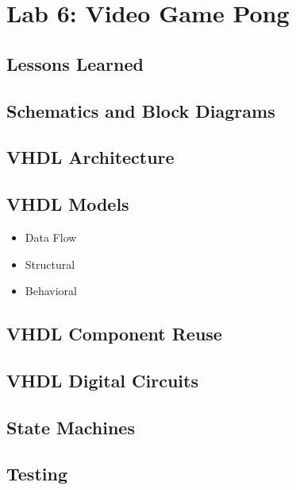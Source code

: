 \chapter{Lab 6: Video Game Pong \\
\label{Introduction}}


\section{Lessons Learned
\label{Section::Lessons Learned}}
 \section{Schematics and Block Diagrams}
 \section{VHDL Architecture}
 \section{VHDL Models}
 \begin{itemize}
     \item Data Flow
     \item Structural
     \item Behavioral
\end{itemize}
 \section{VHDL Component Reuse}
 \section{VHDL Digital Circuits}
 \section{State Machines}
 \section{Testing}
